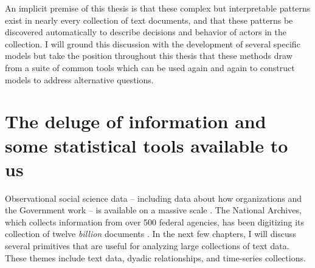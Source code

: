 An implicit premise of this thesis is that these complex but
interpretable patterns exist in nearly every collection of text
documents, and that these patterns be discovered automatically to
describe decisions and behavior of actors in the collection.  I will
ground this discussion with the development of several specific models
but take the position throughout this thesis that these methods draw
from a suite of common tools which can be used again and again to
construct models to address alternative questions.

\section*{The deluge of information and some statistical tools
  available to us}

Observational social science data -- including data about how
organizations and the Government work -- is available on a massive
scale \cite{lazer:2009}. The National Archives, which collects
information from over 500 federal agencies, has been digitizing its
collection of twelve \emph{billion} documents
\cite{national_archives:2012a,national_archives:2012b}.  In the next
few chapters, I will discuss several primitives that are useful for
analyzing large collections of text data.  These themes include text
data, dyadic relationships, and time-series collections.





